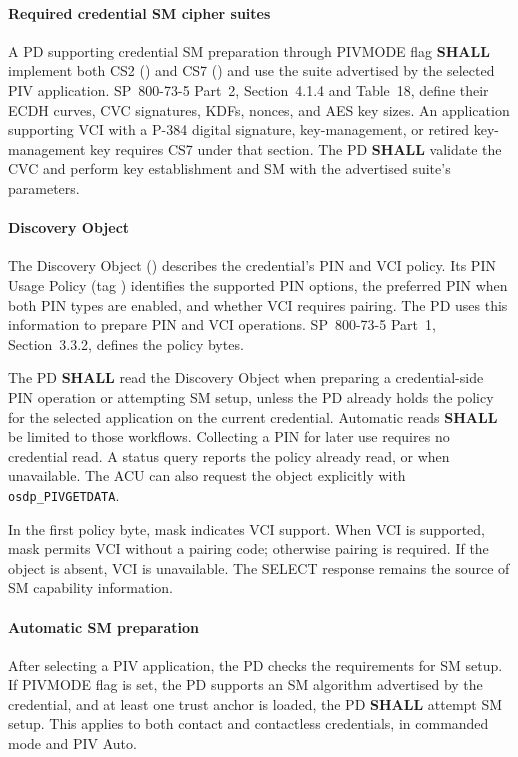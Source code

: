 \paragraph{Required credential SM cipher suites}
A PD supporting credential SM preparation through PIVMODE flag 
\textbf{SHALL} implement both CS2 () and CS7 () and use
the suite advertised by the selected PIV application. SP~800-73-5 Part~2,
Section~4.1.4 and Table~18, define their ECDH curves, CVC signatures, KDFs,
nonces, and AES key sizes. An application supporting VCI with a P-384 digital
signature, key-management, or retired key-management key requires CS7 under
that section. The PD \textbf{SHALL} validate the CVC and perform key
establishment and SM with the advertised suite's parameters.

\paragraph{Discovery Object}
The Discovery Object () describes the credential's PIN and VCI policy.
Its PIN Usage Policy (tag ) identifies the supported PIN options,
the preferred PIN when both PIN types are enabled, and whether VCI requires
pairing. The PD uses this information to prepare PIN and VCI operations.
SP~800-73-5 Part~1, Section~3.3.2, defines the policy bytes.

The PD \textbf{SHALL} read the Discovery Object when preparing a credential-side PIN
operation or attempting SM setup, unless the PD already holds the policy for
the selected application on the current credential. Automatic reads \textbf{SHALL} be limited to those
workflows. Collecting a PIN for later use requires no credential read. A status query
reports the policy already read, or  when unavailable. The ACU can
also request the object explicitly with \texttt{osdp\_PIVGETDATA}.

In the first policy byte, mask  indicates VCI support. When VCI is
supported, mask  permits VCI without a pairing code; otherwise pairing
is required. If the object is absent, VCI is unavailable. The SELECT response
remains the source of SM capability information.

\paragraph{Automatic SM preparation}
After selecting a PIV application, the PD checks the requirements for SM setup.
If PIVMODE flag  is set, the PD supports an SM algorithm advertised
by the credential, and at least one trust anchor is loaded, the PD \textbf{SHALL}
attempt SM setup. This applies to both contact and contactless credentials, in
commanded mode and PIV Auto.

